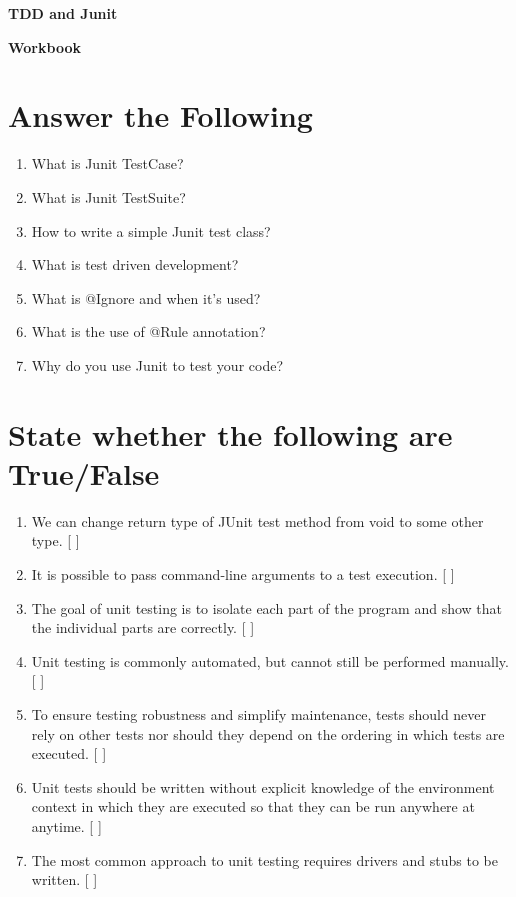 \documentclass[11pt,a4paper]{article}
\def\AnswerBox{\fbox{\begin{minipage}{4in}\hfill\vspace{0.5in}\end{minipage}}}
\begin{document}
\centerline{\huge{ \textbf{TDD and Junit}}}

\vspace{1pc}

\centerline{\huge{ \textbf{ Workbook}}}

\section*{Answer the Following}
\begin{enumerate}\itemsep10pt

\item What is Junit TestCase?

\AnswerBox

\item What is Junit TestSuite?

\AnswerBox

\item How to write a simple Junit test class?

\AnswerBox

\item What is test driven development?

\AnswerBox

\item  What is @Ignore and when it’s used?

\AnswerBox

\item What is the use of @Rule annotation?

\AnswerBox

\item Why do you use Junit to test your code?

\AnswerBox

\end{enumerate}

\section*{State whether the following are True/False}
\begin{enumerate}
\item We can change return type of JUnit test method from void to some other type. [   ]
\item It is possible to pass command-line arguments to a test execution. [   ]
\item The goal of unit testing is to isolate each part of the program and show that the individual parts are correctly. [   ]
\item Unit testing is commonly automated, but cannot still be performed manually. [    ]
\item To ensure testing robustness and simplify maintenance, tests should never rely on other tests nor should they depend on the ordering in which tests are executed. [   ]
\item Unit tests should be written without explicit knowledge of the environment context in which they are executed so that they can be run anywhere at anytime. [   ]
\item The most common approach to unit testing requires drivers and stubs to be written. [   ]
\end{enumerate}
\end{document}
